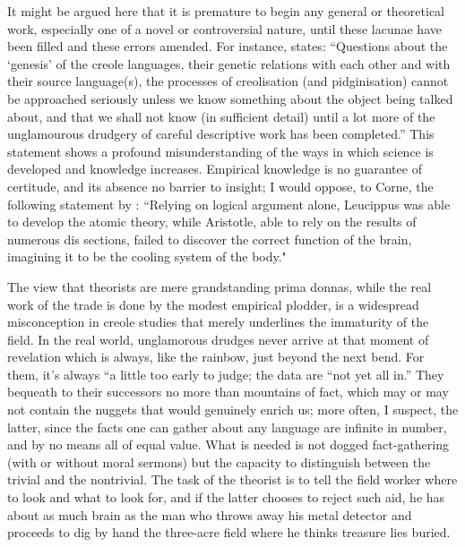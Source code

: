 It might be argued here that it is premature to begin any general or theoretical work, especially one of a novel or controversial nature, until these lacunae have been filled and these errors amended. For instance, \citet[2]{Corne1977} states: ``Questions about the `genesis' of the creole languages, their genetic relations with each other and with their source language(s), the processes of creolisation (and pidginisation) cannot be approached seriously unless we know something about the object being talked about, and that we shall not know (in sufficient detail) until a lot more of the unglamourous drudgery of careful descriptive work has been completed.'' This statement shows a profound misunderstanding of the ways in which science is developed and knowledge increases. Empirical knowledge is no guarantee of certitude, and its absence no barrier to insight; I would oppose, to Corne, the following statement by \citet[3]{Dingwall1979}: ``Relying on logical argument alone, Leucippus was able to develop the atomic theory, while Aristotle, able to rely on the results of numerous dis%
sections, failed to discover the correct function of the brain, imagining it to be the cooling system of the body."

The view that theorists are mere grandstanding prima donnas, while the real work of the trade is done by the modest empirical plodder, is a widespread misconception in creole studies that merely underlines the immaturity of the field. In the real world, unglamorous drudges never arrive at that moment of revelation which is always, like the rainbow, just beyond the next bend. For them, it's always ``a little too early to judge{\textquotedbl}; the data are ``not yet all in.'' They bequeath to their successors no more than mountains of fact, which may or may not contain the nuggets that would genuinely enrich us; more often, I suspect, the latter, since the facts one can gather about any language are infinite in number, and by no means all of equal value. What is needed is not dogged fact-gathering (with or without moral sermons) but the capacity to distinguish between the trivial and the nontrivial. The task of the theorist is to tell the field worker where to look and what to look for, and if the latter chooses to reject such aid, he has about as much brain as the man who throws away his metal detector and proceeds to dig by hand the three-acre field where he thinks treasure lies buried.\\\\

